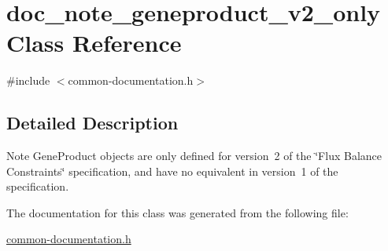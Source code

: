 \hypertarget{classdoc__note__geneproduct__v2__only}{}\section{doc\+\_\+note\+\_\+geneproduct\+\_\+v2\+\_\+only Class Reference}
\label{classdoc__note__geneproduct__v2__only}


{\ttfamily \#include $<$common-\/documentation.\+h$>$}



\subsection{Detailed Description}
\begin{DoxyNote}{Note}
Gene\+Product objects are only defined for version~2 of the \char`\"{}\+Flux Balance Constraints\char`\"{} specification, and have no equivalent in version~1 of the specification. 
\end{DoxyNote}


The documentation for this class was generated from the following file\+:\begin{DoxyCompactItemize}
\item 
\hyperlink{common-documentation_8h}{common-\/documentation.\+h}\end{DoxyCompactItemize}
